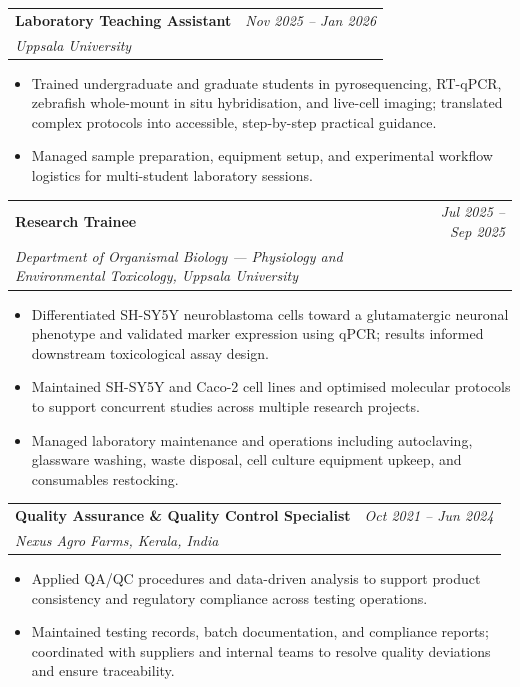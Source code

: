 \documentclass[10pt, a4paper]{article}
\makeatletter
\newcommand{\entry}[3]{%
  \begin{tabularx}{\linewidth}{@{}X r@{}}
    \textbf{#1} & \textit{#3} \\
    \textit{#2} & \\
  \end{tabularx}%
}
\makeatother
\begin{document}
\vspace{5pt}

\entry{Laboratory Teaching Assistant}{Uppsala University}{Nov 2025 -- Jan 2026}
\begin{itemize}
  \item Trained undergraduate and graduate students in pyrosequencing, RT-qPCR, zebrafish
        whole-mount in situ hybridisation, and live-cell imaging; translated complex protocols
        into accessible, step-by-step practical guidance.
  \item Managed sample preparation, equipment setup, and experimental workflow logistics for
        multi-student laboratory sessions.
\end{itemize}

\vspace{5pt}

\entry{Research Trainee}{Department of Organismal Biology --- Physiology and Environmental Toxicology, Uppsala University}{Jul 2025 -- Sep 2025}
\begin{itemize}
  \item Differentiated SH-SY5Y neuroblastoma cells toward a glutamatergic neuronal phenotype
        and validated marker expression using qPCR; results informed downstream toxicological
        assay design.
  \item Maintained SH-SY5Y and Caco-2 cell lines and optimised molecular protocols to support
        concurrent studies across multiple research projects.
  \item Managed laboratory maintenance and operations including autoclaving, glassware washing,
        waste disposal, cell culture equipment upkeep, and consumables restocking.
\end{itemize}

\vspace{5pt}

\entry{Quality Assurance \& Quality Control Specialist}{Nexus Agro Farms, Kerala, India}{Oct 2021 -- Jun 2024}
\begin{itemize}
  \item Applied QA/QC procedures and data-driven analysis to support product consistency and
        regulatory compliance across testing operations.
  \item Maintained testing records, batch documentation, and compliance reports; coordinated
        with suppliers and internal teams to resolve quality deviations and ensure traceability.
\end{itemize}
\end{document}
